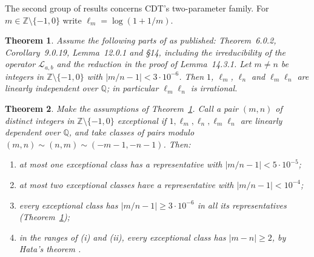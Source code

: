 \documentclass[11pt]{amsart}
\newtheorem{theorem}{Theorem}
\theoremstyle{definition}
\theoremstyle{remark}
\numberwithin{equation}{section}
\newcommand{\ZZ}{\mathbb{Z}}
\newcommand{\QQ}{\mathbb{Q}}
\begin{document}
The second group of results concerns CDT's two-parameter family. For $m\in\ZZ\setminus\{-1,0\}$ write
$\ell_m=\log(1+1/m)$.

\begin{theorem}\label{thm:Cprime}
Assume the following parts of \cite{CDT} as published: Theorem~6.0.2, Corollary~9.0.19, Lemma~12.0.1 and \S14,
including the irreducibility of the operator $\mathcal L_{a,b}$ and the reduction in the proof of Lemma~14.3.1. Let $m\ne n$ be integers in $\ZZ\setminus\{-1,0\}$ with $|m/n-1|<3\cdot10^{-6}$. Then $1$,
$\ell_m$, $\ell_n$ and $\ell_m\ell_n$ are linearly independent over $\QQ$; in particular $\ell_m\ell_n$ is irrational.
\end{theorem}

\begin{theorem}\label{thm:F2}
Make the assumptions of Theorem~\ref{thm:Cprime}. Call a pair $(m,n)$ of distinct integers in $\ZZ\setminus\{-1,0\}$
\emph{exceptional} if $1,\ell_m,\ell_n,\ell_m\ell_n$ are linearly dependent over $\QQ$, and take classes of pairs
modulo $(m,n)\sim(n,m)\sim(-m-1,-n-1)$. Then:
\begin{enumerate}
\item at most one exceptional class has a representative with $|m/n-1|<5\cdot10^{-5}$;
\item at most two exceptional classes have a representative with $|m/n-1|<10^{-4}$;
\item every exceptional class has $|m/n-1|\ge3\cdot10^{-6}$ in all its representatives (Theorem~\ref{thm:Cprime});
\item in the ranges of (i) and (ii), every exceptional class has $|m-n|\ge2$, by Hata's theorem
\cite[Cor.~6.3]{Hat98}.
\end{enumerate}
\end{theorem}
\end{document}
